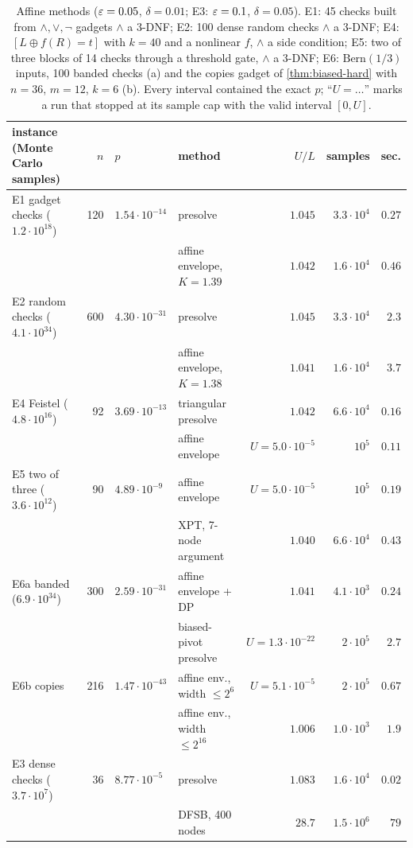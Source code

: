 \begin{table}[t]
\centering\footnotesize
\setlength{\tabcolsep}{4pt}
\begin{tabular}{@{}lrllrrr@{}}
\toprule
instance (Monte Carlo samples) & $n$ & $p$ & method & $U/L$ & samples & sec.\\
\midrule
E1 gadget checks ($1.2\cdot10^{18}$) & 120 & $1.54\cdot10^{-14}$ & presolve & $1.045$ & $3.3\cdot10^4$ & $0.27$\\
 & & & affine envelope, $K=1.39$ & $1.042$ & $1.6\cdot10^4$ & $0.46$\\
E2 random checks ($4.1\cdot10^{34}$) & 600 & $4.30\cdot10^{-31}$ & presolve & $1.045$ & $3.3\cdot10^4$ & $2.3$\\
 & & & affine envelope, $K=1.38$ & $1.041$ & $1.6\cdot10^4$ & $3.7$\\
E4 Feistel ($4.8\cdot10^{16}$) & 92 & $3.69\cdot10^{-13}$ & triangular presolve & $1.042$ & $6.6\cdot10^4$ & $0.16$\\
 & & & affine envelope & $U{=}5.0\cdot10^{-5}$ & $10^5$ & $0.11$\\
E5 two of three ($3.6\cdot10^{12}$) & 90 & $4.89\cdot10^{-9}$ & affine envelope & $U{=}5.0\cdot10^{-5}$ & $10^5$ & $0.19$\\
 & & & XPT, 7-node argument & $1.040$ & $6.6\cdot10^4$ & $0.43$\\
E6a banded ($6.9\cdot10^{34}$) & 300 & $2.59\cdot10^{-31}$ & affine envelope + DP & $1.041$ & $4.1\cdot10^3$ & $0.24$\\
 & & & biased-pivot presolve & $U{=}1.3\cdot10^{-22}$ & $2\cdot10^5$ & $2.7$\\
E6b copies & 216 & $1.47\cdot10^{-43}$ & affine env., width $\le2^6$ & $U{=}5.1\cdot10^{-5}$ & $2\cdot10^5$ & $0.67$\\
 & & & affine env., width $\le2^{16}$ & $1.006$ & $1.0\cdot10^3$ & $1.9$\\
E3 dense checks ($3.7\cdot10^7$) & 36 & $8.77\cdot10^{-5}$ & presolve & $1.083$ & $1.6\cdot10^4$ & $0.02$\\
 & & & DFSB, 400 nodes & $28.7$ & $1.5\cdot10^6$ & $79$\\
\bottomrule
\end{tabular}
\caption{Affine methods ($\varepsilon=0.05$, $\delta=0.01$; E3: $\varepsilon=0.1$, $\delta=0.05$). E1: 45
checks built from $\wedge,\vee,\neg$ gadgets $\wedge$ a 3-DNF; E2: 100 dense random checks
$\wedge$ a 3-DNF; E4: $[L\oplus f(R)=t]$ with $k=40$ and a nonlinear $f$, $\wedge$ a side
condition; E5: two of three blocks of 14 checks through a threshold gate, $\wedge$ a 3-DNF;
E6: $\mathrm{Bern}(1/3)$ inputs, 100 banded checks (a) and the copies gadget of
\cref{thm:biased-hard} with $n=36$, $m=12$, $k=6$ (b). Every interval contained the exact
$p$; ``$U{=}\dots$'' marks a run that stopped at its sample cap with the valid interval
$[0,U]$.}
\label{tab:affine}
\end{table}

